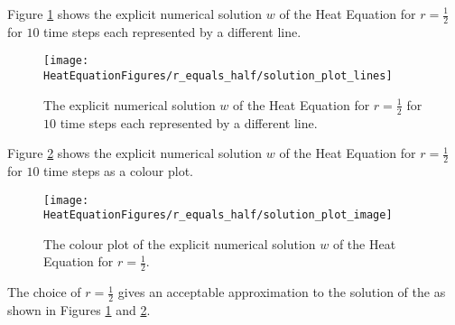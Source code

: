 \begin{example}
Figure \ref{Plot_FTCS_1_2} shows the explicit numerical solution $w$ of the Heat Equation for $r=\frac{1}{2}$ for $10$ time steps each represented by a different line.
\begin{figure}[H]
  \caption{The explicit numerical solution $w$ of the Heat Equation for $r=\frac{1}{2}$ for $10$ time steps each represented by a different line.}
  \centering
    \texttt{[image: HeatEquationFigures/r\_equals\_half/solution\_plot\_lines]}     \label{Plot_FTCS_1_2}

\end{figure}
Figure \ref{Color_FTCS_1_2} shows the explicit numerical solution $w$ of the Heat Equation for $r=\frac{1}{2}$ for $10$ time steps as a colour plot.

\begin{figure}[H]
  \caption{The colour plot of the explicit numerical solution $w$ of the Heat Equation for $r=\frac{1}{2}$.}
  \centering
    \texttt{[image: HeatEquationFigures/r\_equals\_half/solution\_plot\_image]}\label{Color_FTCS_1_2}
\end{figure}


The choice of $r=\frac{1}{2}$  gives an acceptable approximation to the solution of the  as shown in Figures  \ref{Plot_FTCS_1_2} and \ref{Color_FTCS_1_2}.
\end{example}
